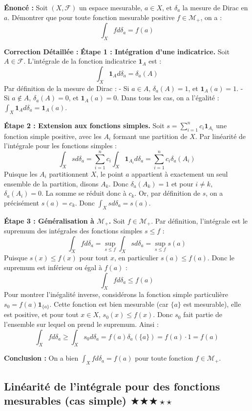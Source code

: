 \documentclass[11pt,a4paper]{article}
\begin{document}
\textbf{Énonc\'e :}
Soit $(X, \mathcal{F})$ un espace mesurable, $a \in X$, et $\delta_a$ la mesure de Dirac en $a$.
D\'emontrer que pour toute fonction mesurable positive $f \in \mathcal{M}_+$, on a :
$$\int_X f d\delta_a = f(a)$$

\textbf{Correction D\'etaill\'ee :}
\textbf{Étape 1 : Int\'egration d'une indicatrice.}
Soit $A \in \mathcal{F}$. L'int\'egrale de la fonction indicatrice $\mathbf{1}_A$ est :
$$\int_X \mathbf{1}_A d\delta_a = \delta_a(A)$$
Par d\'efinition de la mesure de Dirac :
- Si $a \in A$, $\delta_a(A) = 1$, et $\mathbf{1}_A(a) = 1$.
- Si $a \notin A$, $\delta_a(A) = 0$, et $\mathbf{1}_A(a) = 0$.
Dans tous les cas, on a l'\'egalit\'e : $\int_X \mathbf{1}_A d\delta_a = \mathbf{1}_A(a)$.

\textbf{Étape 2 : Extension aux fonctions simples.}
Soit $s = \sum_{i=1}^n c_i \mathbf{1}_{A_i}$ une fonction simple positive, avec les $A_i$ formant une partition de $X$.
Par lin\'earit\'e de l'int\'egrale pour les fonctions simples :
$$\int_X s d\delta_a = \sum_{i=1}^n c_i \int_X \mathbf{1}_{A_i} d\delta_a = \sum_{i=1}^n c_i \delta_a(A_i)$$
Puisque les $A_i$ partitionnent $X$, le point $a$ appartient \`a exactement un seul ensemble de la partition, disons $A_k$.
Donc $\delta_a(A_k) = 1$ et pour $i \neq k$, $\delta_a(A_i) = 0$.
La somme se r\'eduit donc \`a $c_k$. Or, par d\'efinition de $s$, on a pr\'ecis\'ement $s(a) = c_k$.
Donc $\int_X s d\delta_a = s(a)$.

\textbf{Étape 3 : G\'en\'eralisation \`a $\mathcal{M}_+$.}
Soit $f \in \mathcal{M}_+$. Par d\'efinition, l'int\'egrale est le supremum des int\'egrales des fonctions simples $s \le f$ :
$$\int_X f d\delta_a = \sup_{s \le f} \int_X s d\delta_a = \sup_{s \le f} s(a)$$
Puisque $s(x) \le f(x)$ pour tout $x$, en particulier $s(a) \le f(a)$. Donc le supremum est inf\'erieur ou \'egal \`a $f(a)$ :
$$\int_X f d\delta_a \le f(a)$$
Pour montrer l'in\'egalit\'e inverse, consid\'erons la fonction simple particuli\`ere $s_0 = f(a) \mathbf{1}_{\{a\}}$.
Cette fonction est bien mesurable (car $\{a\}$ est mesurable), elle est positive, et pour tout $x \in X$, $s_0(x) \le f(x)$.
Donc $s_0$ fait partie de l'ensemble sur lequel on prend le supremum.
Ainsi :
$$\int_X f d\delta_a \ge \int_X s_0 d\delta_a = f(a) \delta_a(\{a\}) = f(a) \cdot 1 = f(a)$$

\textbf{Conclusion :}
On a bien $\int_X f d\delta_a = f(a)$ pour toute fonction $f \in \mathcal{M}_+$.


\subsection*{Lin\'earit\'e de l'int\'egrale pour des fonctions mesurables (cas simple) \quad $\bigstar\bigstar\bigstar\star\star$}
\end{document}
